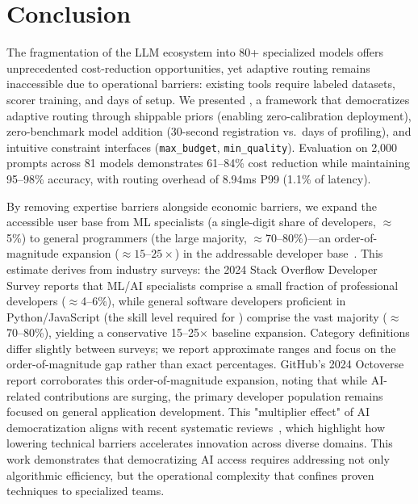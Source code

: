 
\section{Conclusion}
\label{sec:conclusion}

The fragmentation of the LLM ecosystem into 80+ specialized models offers unprecedented cost-reduction opportunities, yet adaptive routing remains inaccessible due to operational barriers: existing tools require labeled datasets, scorer training, and days of setup. We presented \ours{}, a framework that democratizes adaptive routing through shippable priors (enabling zero-calibration deployment), zero-benchmark model addition (30-second registration vs.\ days of profiling), and intuitive constraint interfaces (\texttt{max\_budget}, \texttt{min\_quality}). Evaluation on 2,000 prompts across 81 models demonstrates 61--84\% cost reduction while maintaining 95--98\% accuracy, with routing overhead of 8.94ms P99 (1.1\% of latency).

By removing expertise barriers alongside economic barriers, we expand the accessible user base from ML specialists (a single-digit share of developers, $\approx$5\%) to general programmers (the large majority, $\approx$70--80\%)---an order-of-magnitude expansion ($\approx 15$--$25\times$) in the addressable developer base~\cite{stackoverflow2024survey,github2025developer,evansdata2024population}. This estimate derives from industry surveys: the 2024 Stack Overflow Developer Survey reports that ML/AI specialists comprise a small fraction of professional developers ($\approx$4--6\%), while general software developers proficient in Python/JavaScript (the skill level required for \ours{}) comprise the vast majority ($\approx$70--80\%), yielding a conservative 15--25$\times$ baseline expansion. Category definitions differ slightly between surveys; we report approximate ranges and focus on the order-of-magnitude gap rather than exact percentages. GitHub's 2024 Octoverse report corroborates this order-of-magnitude expansion, noting that while AI-related contributions are surging, the primary developer population remains focused on general application development. This "multiplier effect" of AI democratization aligns with recent systematic reviews~\cite{chan2025democratizing}, which highlight how lowering technical barriers accelerates innovation across diverse domains. This work demonstrates that democratizing AI access requires addressing not only algorithmic efficiency, but the operational complexity that confines proven techniques to specialized teams.

